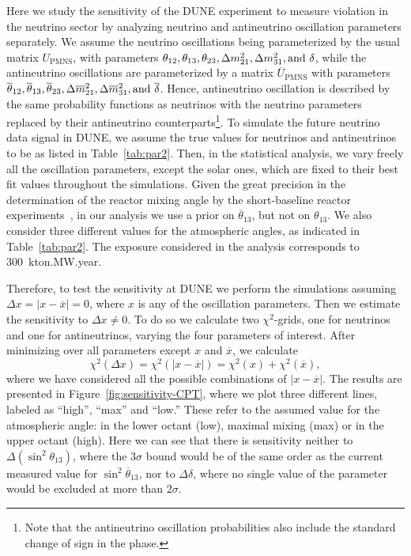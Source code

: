 Here we study the sensitivity of the DUNE experiment to measure  violation in the neutrino sector by analyzing neutrino and antineutrino oscillation parameters separately. We assume the neutrino oscillations being parameterized by the usual  matrix $U_{\text{PMNS}}$, with parameters $\theta_{12},\theta_{13},\theta_{23},\Delta m_{21}^2,\Delta m_{31}^2, {\rm and}~\delta$, while the antineutrino oscillations are parameterized by a matrix $\overline{U}_{\text{PMNS}}$ with parameters $\overline{\theta}_{12},\overline{\theta}_{13},\overline{\theta}_{23},\Delta \overline{m}_{21}^2,\Delta \overline{m}_{31}^2, {\rm and}~\overline{\delta}$. Hence, antineutrino oscillation is described  by the same probability functions as neutrinos with the neutrino parameters replaced by their antineutrino counterparts\footnote{Note that the antineutrino oscillation probabilities also include the standard change of sign in the  phase.}. 
To simulate the future neutrino data signal in DUNE, we assume the true values for neutrinos and antineutrinos to be as listed in Table~\ref{tab:par2}.
Then, in the statistical analysis, we vary freely all the oscillation parameters, except the solar ones, which are fixed to their best fit values throughout the simulations. Given the great precision in the determination of the reactor mixing angle by the short-baseline reactor experiments~\cite{An:2016ses,RENO:2015ksa,Abe:2014bwa}, in our analysis we use a prior on $\overline{\theta}_{13}$, but not on $\theta_{13}$. We also consider three different values for the atmospheric angles, as indicated in Table~\ref{tab:par2}. The exposure considered in the analysis corresponds to 300~kton.MW.year.

Therefore, to test the sensitivity at DUNE we perform the simulations assuming $\Delta x = |x-\overline{x}| = 0$, where $x$ is any of the oscillation parameters. Then we estimate the sensitivity to $\Delta x\neq 0$. To do so we calculate two $\chi^2$-grids, one for neutrinos and one for antineutrinos, varying the four parameters of interest. After minimizing over all parameters except $x$ and $\overline{x}$, we calculate 
%
\begin{equation}
 \chi^2(\Delta x) = \chi^2(|x-\overline{x}|) = \chi^2(x)+\chi^2(\overline{x}),
 \label{eq:chi2-nu-nubar}
\end{equation}
%
where we have considered all the possible combinations of $|x-\overline{x}|$. The results are presented in Figure~\ref{fig:sensitivity-CPT}, where we plot three different lines, labeled as ``high'', ``max'' and ``low.'' These refer to the assumed value for the atmospheric angle: in the lower octant (low), maximal mixing (max) or in the upper octant (high). Here we can see that there is sensitivity neither to $\Delta(\sin^2\theta_{13})$, where the 3$\sigma$ bound would be of the same order %
as the current measured value for $\sin^2\overline{\theta}_{13}$, nor to $\Delta\delta$, where no single value of the parameter would be excluded at more than 2$\sigma$.

